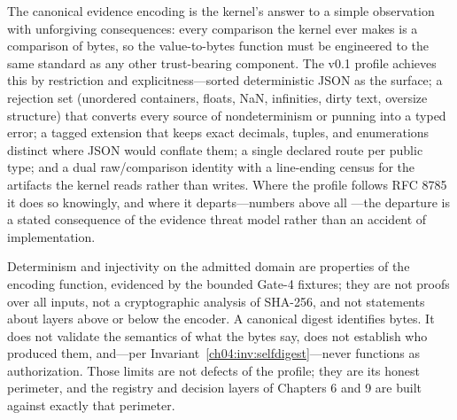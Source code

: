 The canonical evidence encoding is the kernel's answer to a simple
observation with unforgiving consequences: every comparison the kernel
ever makes is a comparison of bytes, so the value-to-bytes function must
be engineered to the same standard as any other trust-bearing component.
The v0.1 profile achieves this by restriction and explicitness---sorted
deterministic JSON as the surface; a rejection set (unordered containers,
floats, NaN, infinities, dirty text, oversize structure) that converts
every source of nondeterminism or punning into a typed error; a tagged
extension that keeps exact decimals, tuples, and enumerations distinct
where JSON would conflate them; a single declared route per public type;
and a dual raw/comparison identity with a line-ending census for the
artifacts the kernel reads rather than writes. Where the profile follows
RFC 8785 it does so knowingly, and where it departs---numbers above all
---the departure is a stated consequence of the evidence threat model
rather than an accident of implementation.

\begin{boundary}\label{ch05:bd:close}
Determinism and injectivity on the admitted domain are properties of the
encoding function, evidenced by the bounded Gate-4 fixtures; they are not
proofs over all inputs, not a cryptographic analysis of SHA-256, and not
statements about layers above or below the encoder. A canonical digest
identifies bytes. It does not validate the semantics of what the bytes
say, does not establish who produced them, and---per
Invariant~\ref{ch04:inv:selfdigest}---never functions as authorization.
Those limits are not defects of the profile; they are its honest
perimeter, and the registry and decision layers of Chapters 6 and 9 are
built against exactly that perimeter.
\end{boundary}
